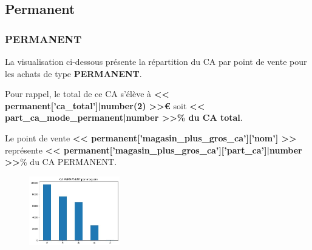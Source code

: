 \subsection{Permanent}

\begin{frame}
    \tiny
    \frametitle{PERMANENT}

    La visualisation ci-dessous présente la répartition du CA par point de vente pour les achats de type \textbf{PERMANENT}.\par
    Pour rappel, le total de ce CA s’élève à \textbf{<< permanent['ca_total']|number(2) >>€} soit \textbf{<< part_ca_mode_permanent|number >>\% du CA total}.\par

    Le point de vente \textbf{<< permanent['magasin_plus_gros_ca']['nom'] >>} représente \textbf{<< permanent['magasin_plus_gros_ca']['part_ca']|number >>}\% du CA PERMANENT.\par

    \begin{figure}[h]
        \centering
        \includegraphics[height=3cm]{assets/__ca_permanent_par_magasin}
    \end{figure}
\end{frame}
